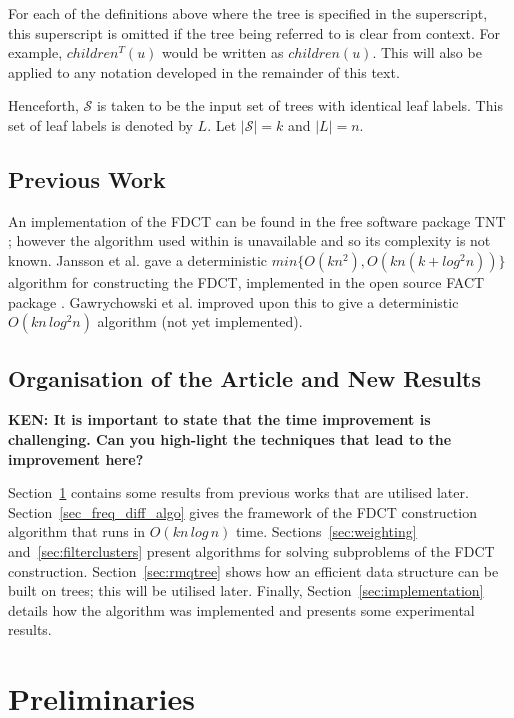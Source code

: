 \documentclass[final,1p,times]{elsarticle}
\begin{document}
    For each of the definitions above where the tree is specified in the superscript, this superscript is omitted if the tree being referred to is clear from context. For example, $children^T(u)$ would be written as $children(u)$. This will also be applied to any notation developed in the remainder of this text.

    Henceforth, $\mathcal{S}$ is taken to be the input set of trees with identical leaf labels. This set of leaf labels is denoted by $L$. Let $|\mathcal{S}| = k$ and $|L| = n$.

    \subsection{Previous Work}
    \label{subsec:previouswork}

    An implementation of the FDCT can be found in the free software package TNT \cite{goloboff2008tnt}; however the algorithm used within is unavailable and so its complexity is not known. Jansson et al. \cite{jansson2018algorithms} gave a deterministic $min\{O(kn^2), O(kn(k + log^2 n))\}$ algorithm for constructing the FDCT, implemented in the open source FACT package \cite{jansson2016improved}. Gawrychowski et al. \cite{gawrychowski2017faster} improved upon this to give a deterministic $O(kn\,log^2n)$ algorithm (not yet implemented).

    \subsection{Organisation of the Article and New Results}

    {\bf KEN: It is important to state that the time improvement is challenging. Can you high-light the techniques that lead to the improvement here?}

    Section~\ref{sec:preliminaries} contains some results from previous works that are utilised later.
    Section~\ref{sec_freq_diff_algo} gives the framework of the FDCT construction algorithm that runs in $O(kn\,log\,n)$ time.
    Sections~\ref{sec:weighting} and~\ref{sec:filterclusters} present algorithms for solving subproblems of the FDCT construction.
    Section~\ref{sec:rmqtree} shows how an efficient data structure can be built on trees; this will be utilised later.
    Finally, Section~\ref{sec:implementation} details how the algorithm was implemented and presents some experimental results.

    \section{Preliminaries}
    \label{sec:preliminaries}
\end{document}
